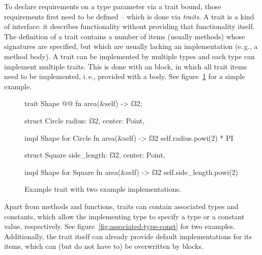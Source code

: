 To declare requirements on a type parameter via a trait bound, those requirements first need to be defined -- which is done via \emph{traits}.
A trait is a kind of interface: it describes functionality without providing that functionality itself.
The definition of a trait contains a number of items (usually methods) whose signatures are specified, but which are usually lacking an implementation (e.\,g., a method body).
A trait can be implemented by multiple types and each type can implement multiple traits.
This is done with an  block, in which all trait items need to be implemented, i.\,e., provided with a body.
See figure~\ref{fig:shapes} for a simple example.

\newpage

\begin{figure}[t]
  \centering
  \begin{minipage}{.65\textwidth}
    \begin{rustcode}
    trait Shape {@@
        fn area(&self) -> f32;
    }
    \end{rustcode}
    \end{minipage}

    \vspace{3mm}

    \begin{minipage}[t]{.49\textwidth}
    \begin{rustcode}
    struct Circle {
        radius: f32,
        center: Point,
    }

    impl Shape for Circle {
        fn area(&self) -> f32 {
            self.radius.powi(2) * PI
        }
    }
    \end{rustcode}
  \end{minipage}
  \begin{minipage}[t]{.49\textwidth}
    \begin{rustcode}
    struct Square {
        side_length: f32,
        center: Point,
    }

    impl Shape for Square {
        fn area(&self) -> f32 {
            self.side_length.powi(2)
        }
    }
    \end{rustcode}
  \end{minipage}
  \caption{Example trait with two example implementations.}
  \label{fig:shapes}
  \vspace{5mm}
\end{figure}

Apart from methods and functions, traits can contain associated types and constants, which allow the implementing type to specify a type or a constant value, respectively.
See figure~\ref{fig:associated-type-const} for two examples.
Additionally, the trait itself can already provide default implementations for its items, which can (but do not have to) be overwritten by  blocks.



